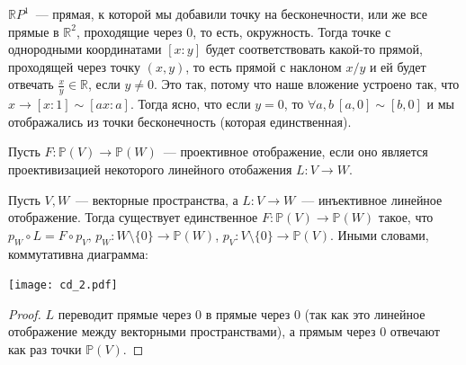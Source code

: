 \documentclass[11pt]{article}
\begin{document}
    \begin{example}
    $\mathbb{R}P^1$~--- прямая, к которой мы добавили точку на бесконечности, или же все прямые в $\mathbb{R}^2$, проходящие через 0, то есть, окружность.
     Тогда точке с однородными координатами $[x:y]$ будет соответствовать какой-то прямой, проходящей через точку $(x, y)$, то есть прямой с наклоном $x / y$ и ей будет отвечать $\frac{x}{y} \in \mathbb{R}$, если $y \neq 0$.
    Это так, потому что наше вложение устроено так, что $x \to [x : 1] \sim [ax : a]$. Тогда ясно, что если $y = 0$, то $\forall a, b \ [a, 0] \sim [b, 0]$ и мы отображались из точки бесконечность (которая единственная).
    \end{example}
     \begin{definition}
         Пусть $F\colon \mathbb{P}(V) \to \mathbb{P}(W)$~--- проективное отображение, если оно является проективизацией некоторого линейного отобажения $L\colon V \to W$.
    \end{definition}
    \begin{lemma}
        Пусть $V, W$~--- векторные пространства, а $L\colon V \to W$~---   инъективное линейное отображение. Тогда существует единственное $F\colon \mathbb{P}(V) \to \mathbb{P}(W)$ такое, что
        $p_W \circ L = F \circ p_V$, $p_W \colon W \setminus \{ 0\} \to \mathbb{P}(W)$, $p_V \colon V \setminus \{ 0\} \to \mathbb{P}(V)$.
        Иными словами, коммутативна диаграмма:
        \begin{center}
            \texttt{[image: cd\_2.pdf]}
        \end{center}
    \end{lemma}
    \begin{proof}
        $L$ переводит прямые через 0 в прямые через 0 (так как это линейное отображение между векторными пространствами), а прямым через 0 отвечают как раз точки $\mathbb{P}(V)$.
    \end{proof}
\end{document}
